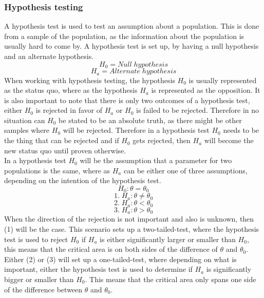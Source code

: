 \subsubsection{Hypothesis testing}
A hypothesis test is used to test an assumption about a population. This is done from a sample of the population, as the information about the population is usually hard to come by. A hypothesis test is set up, by having a null hypothesis and an alternate hypothesis.
$$H_0 = Null\; hypothesis$$
$$H_a = Alternate\; hypothesis$$
When working with hypothesis testing, the hypothesis $H_0$ is usually represented as the status quo, where as the hypothesis $H_a$ is represented as the opposition. It is also important to note that there is only two outcomes of a hypothesis test, either $H_0$ is rejected in favor of $H_a$ or $H_0$ is failed to be rejected. Therefore in no situation can $H_0$ be stated to be an absolute truth, as there might be other samples where $H_0$ will be rejected. Therefore in a hypothesis test $H_0$ needs to be the thing that can be rejected and if $H_0$ gets rejected, then $H_a$ will become the new status quo until proven otherwise.\\
In a hypothesis test $H_0$ will be the assumption that a parameter for two populations is the same, where as $H_a$ can be either one of three assumptions, depending on the intention of the hypothesis test.
$$H_0: \theta = \theta_0$$
$$1.\;H_a: \theta \neq \theta_0$$
$$2.\;H_a: \theta < \theta_0$$
$$3.\;H_a: \theta > \theta_0$$
When the direction of the rejection is not important and also is unknown, then (1) will be the case. This scenario sets up a two-tailed-test, where the hypothesis test is used to reject $H_0$ if $H_a$ is either significantly larger or smaller than $H_0$, this means that the critical area is on both sides of the difference of $\theta$ and $\theta_0$. Either (2) or (3) will set up a one-tailed-test, where depending on what is important, either the hypothesis test is used to determine if $H_a$ is significantly bigger or smaller than $H_0$. This means that the critical area only spans one side of the difference between $\theta$ and $\theta_0$.\\


